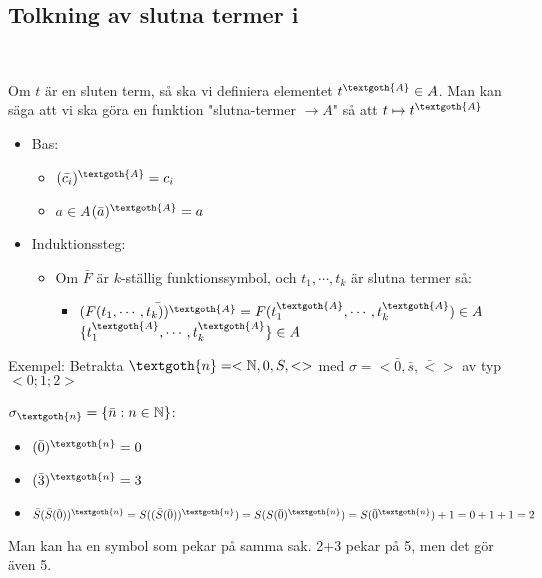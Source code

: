 \subsection{Tolkning av slutna termer i }\hfill\\
\par\bigskip
\noindent Om $t$ är en sluten term, så ska vi definiera elementet $t^{\textgoth{A}}\in A$. Man kan säga att vi ska göra en funktion "slutna-termer $\to A$" så att $t\mapsto t^{\textgoth{A}}$ 
\par\bigskip
\begin{itemize}
  \item Bas:
    \begin{itemize}
      \item $(\bar{c_i})^{\textgoth{A}} = c_i$
      \item $a\in A$\qquad $(\bar{a})^{\textgoth{A}} = a$
    \end{itemize}
  \item Induktionssteg:
    \begin{itemize}
      \item Om $\bar{F}$ är $k$-ställig funktionssymbol, och $t_1,\cdots,t_k$ är slutna termer så:
        \begin{itemize}
          \item $\bar{(F(t_1,\cdots,t_k))^{\textgoth{A}}}= F(t_1^{\textgoth{A}},\cdots,t_k^{\textgoth{A}})\in A$\qquad $\{t_1^{\textgoth{A}},\cdots, t_k^{\textgoth{A}}\}\in A$
        \end{itemize}
    \end{itemize}
\end{itemize}
\par\bigskip
\noindent Exempel: Betrakta $\textgoth{n} = <\N,0,S,<>$ med $\sigma = <\bar{0}, \bar{s}, \bar{<}>$ av typ $<0;1;2>$\par
\noindent $\sigma_{\textgoth{n}} = \{\bar{n}:n\in\N\}$:
\par\bigskip
\begin{itemize}
  \item $(\bar{0})^{\textgoth{n}}=0$
  \item $(\bar{3})^{\textgoth{n}}=3$
  \item $\bar{S}(\bar{S}(\bar{0}))^{\textgoth{n}} = S((\bar{S}(\bar{0}))^{\textgoth{n}}) = S(S(\bar{0})^{\textgoth{n}}) = S(\bar{0}^{\textgoth{n}})+1 = 0+1+1 = 2$
\end{itemize}
\par\bigskip
\noindent Man kan ha en symbol som pekar på samma sak. 2+3 pekar på 5, men det gör även 5.
\par\bigskip
